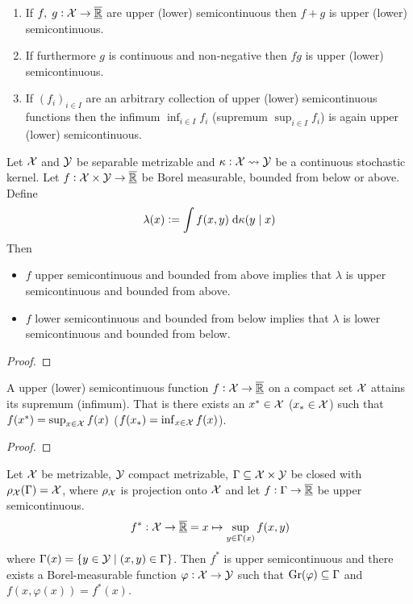 \begin{prop}
  \leavevmode
  \begin{enumerate}
    \item If $f,\; g : \mathcal{X} \to \overline{\underline{\mathbb{R}}}$ are upper (lower) semicontinuous then
  $f + g$ is upper (lower) semicontinuous.
\item If furthermore $g$ is continuous and non-negative then
$fg$ is upper (lower) semicontinuous.
\item If $(f_i)_{i \in I}$ are an arbitrary collection of upper (lower)
  semicontinuous functions then the infimum $\inf_{i \in I} f_i$
  (supremum $\sup_{i \in I} f_i$) is again upper (lower) semicontinuous.
  \end{enumerate}
  \label{prop:sumProdSemiC}
\end{prop}

\begin{prop}
  Let $\mathcal{X}$ and $\mathcal{Y}$ be separable metrizable and
  $\kappa : \mathcal{X} \leadsto \mathcal{Y}$ be a continuous stochastic
  kernel. Let $f : \mathcal{X} \times \mathcal{Y} \to \overline{\underline{\mathbb{R}}}$ be Borel measurable,
  bounded from below or above. Define
  \[ \lambda(x) \vcentcolon= \int f(x, y) \; \mathrm{d} \kappa(y \mid x) \]
  Then
  \begin{itemize}
    \item $f$ upper semicontinuous and bounded from above implies that
      $\lambda$ is upper semicontinuous and bounded from above.
    \item $f$ lower semicontinuous and bounded from below implies that
      $\lambda$ is lower semicontinuous and bounded from below.
  \end{itemize}
  \label{prop:intSemiC}
\end{prop}
\begin{proof}
\end{proof}

\begin{prop}
  A upper (lower) semicontinuous function $f: \mathcal{X} \to \overline{\underline{\mathbb{R}}}$ on a compact
  set $\mathcal{X}$ attains its
  supremum (infimum). That is there exists an $x^* \in \mathcal{X}$ 
  ($x_* \in \mathcal{X}$) such that
  $f(x^*) = \sup_{x \in \mathcal{X}} f(x)$
  ($f(x_*) = \inf_{x \in \mathcal{X}} f(x)$).
  \label{prop:supSemiC}
\end{prop}
\begin{proof}
\end{proof}

\begin{prop}
  Let $\mathcal{X}$ be metrizable, $\mathcal{Y}$ compact metrizable,
  $\Gamma \subseteq \mathcal{X} \times \mathcal{Y}$ be closed with
  $\rho_\mathcal{X} (\Gamma) = \mathcal{X}$, where
  $\rho_\mathcal{X}$ is projection onto $\mathcal{X}$
  and let $f : \Gamma \to \overline{\underline{\mathbb{R}}}$ be upper semicontinuous.
  \[ f^* : \mathcal{X} \to \overline{\underline{\mathbb{R}}} = x \mapsto \sup_{y \in \Gamma(x)} f(x, y) \]
  where $\Gamma(x) = \{ y \in \mathcal{Y} \mid (x, y) \in \Gamma \}$.
  Then $f^*$ is upper semicontinuous and there exists a Borel-measurable
  function $\varphi : \mathcal{X} \to \mathcal{Y}$ such that
  $\mathrm{Gr}(\varphi) \subseteq \Gamma$ and
  $f(x, \varphi(x)) = f^*(x)$.
  \label{prop:measSel}
\end{prop}

